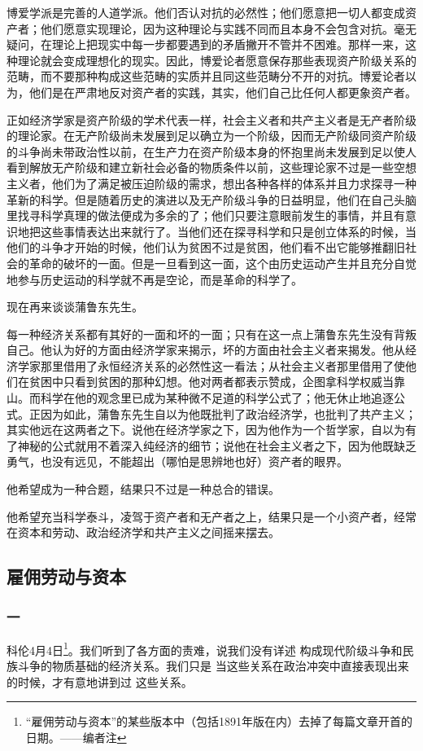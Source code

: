 \documentclass[a4paper,twoside,12pt,AutoFakeBold]{ctexart}
\begin{document}
博爱学派是完善的人道学派。他们否认对抗的必然性；他们愿意把一切人都变成资产者；他们愿意实现理论，因为这种理论与实践不同而且本身不会包含对抗。毫无疑问，在理论上把现实中每一步都要遇到的矛盾撇开不管并不困难。那样一来，这种理论就会变成理想化的现实。因此，博爱论者愿意保存那些表现资产阶级关系的范畴，而不要那种构成这些范畴的实质并且同这些范畴分不开的对抗。博爱论者以为，他们是在严肃地反对资产者的实践，其实，他们自己比任何人都更象资产者。

正如经济学家是资产阶级的学术代表一样，社会主义者和共产主义者是无产者阶级的理论家。在无产阶级尚未发展到足以确立为一个阶级，因而无产阶级同资产阶级的斗争尚未带政治性以前，在生产力在资产阶级本身的怀抱里尚未发展到足以使人看到解放无产阶级和建立新社会必备的物质条件以前，这些理论家不过是一些空想主义者，他们为了满足被压迫阶级的需求，想出各种各样的体系并且力求探寻一种革新的科学。但是随着历史的演进以及无产阶级斗争的日益明显，他们在自己头脑里找寻科学真理的做法便成为多余的了；他们只要注意眼前发生的事情，并且有意识地把这些事情表达出来就行了。当他们还在探寻科学和只是创立体系的时候，当他们的斗争才开始的时候，他们认为贫困不过是贫困，他们看不出它能够推翻旧社会的革命的破坏的一面。但是一旦看到这一面，这个由历史运动产生并且充分自觉地参与历史运动的科学就不再是空论，而是革命的科学了。

现在再来谈谈蒲鲁东先生。

每一种经济关系都有其好的一面和坏的一面；只有在这一点上蒲鲁东先生没有背叛自己。他认为好的方面由经济学家来揭示，坏的方面由社会主义者来揭发。他从经济学家那里借用了永恒经济关系的必然性这一看法；从社会主义者那里借用了使他们在贫困中只看到贫困的那种幻想。他对两者都表示赞成，企图拿科学权威当靠山。而科学在他的观念里已成为某种微不足道的科学公式了；他无休止地追逐公式。正因为如此，蒲鲁东先生自以为他既批判了政治经济学，也批判了共产主义；其实他远在这两者之下。说他在经济学家之下，因为他作为一个哲学家，自以为有了神秘的公式就用不着深入纯经济的细节；说他在社会主义者之下，因为他既缺乏勇气，也没有远见，不能超出（哪怕是思辨地也好）资产者的眼界。

他希望成为一种合题，结果只不过是一种总合的错误。

他希望充当科学泰斗，凌驾于资产者和无产者之上，结果只是一个小资产者，经常在资本和劳动、政治经济学和共产主义之间摇来摆去。


\newpage

\subsection{雇佣劳动与资本}
\subsubsection{一}
科伦4月4日\footnote{“雇佣劳动与资本”的某些版本中（包括1891年版在内）去掉了每篇文章开首的日期。——编者注}。我们听到了各方面的责难，说我们没有详述
构成现代阶级斗争和民族斗争的物质基础的经济关系。我们只是
当这些关系在政治冲突中直接表现出来的时候，才有意地讲到过
这些关系。
\end{document}
